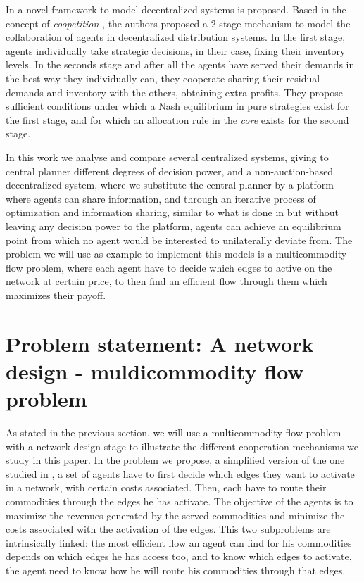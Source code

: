 \documentclass[review]{elsarticle}
\begin{document}
In \cite{ANUPINDI2001} a novel framework to model decentralized systems is proposed. Based in the concept of \emph{coopetition} \cite{BRANDENBURGER1996},
the authors proposed a 2-stage mechanism to model the collaboration of agents in
decentralized distribution systems. In the first stage, agents individually
take strategic decisions, in their case, fixing their inventory levels. In the
seconds stage and after all the agents have served their demands in the best way they individually can, they cooperate sharing their residual demands and inventory with the others, obtaining
extra profits. They propose sufficient conditions under which a Nash equilibrium
in pure strategies exist for the first stage, and for which an allocation rule in
the \emph{core} exists for the second stage.




In this work we analyse and compare several centralized systems,
giving to central planner different degrees of decision power, and a non-auction-based decentralized system, where we substitute the central planner by a platform where agents can share information, and through an iterative process of optimization
and information sharing, similar to what is done in \cite{WANG2014} but without leaving any decision power to the platform, agents can achieve an equilibrium point from which no agent would be interested to unilaterally deviate from. The problem we
will use as example to implement this models is a multicommodity flow problem,
where each agent have to decide which edges to active on the network at certain
price, to then find an efficient flow through them which maximizes their
payoff.

\section{Problem statement: A network design - muldicommodity flow problem}\label{seq:probdefinition} 

As stated in the previous section, we will use a multicommodity flow problem
with a network design stage to illustrate the different cooperation
mechanisms we study in this paper. In the problem we propose, a simplified version of the one studied in \citep{AGARWAL2008175}, a set of agents have
to first decide which edges they want to activate in a network, with certain
costs associated. Then, each have to route their commodities through the edges
he has activate. The objective of the agents is to maximize the revenues generated by the served commodities and minimize the costs associated with the activation of the edges. This two subproblems are intrinsically linked: the most efficient flow an agent can find for his commodities depends on which edges he has access too, and to know which edges to activate, the agent need to know how he will route his commodities through that edges. 
\end{document}
